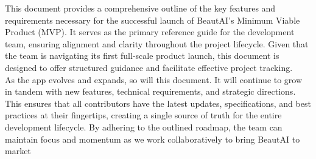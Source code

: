 This document provides a comprehensive outline of the key features and requirements necessary for the successful launch of BeautAI's Minimum Viable Product (MVP). It serves as the primary reference guide for the development team, ensuring alignment and clarity throughout the project lifecycle. Given that the team is navigating its first full-scale product launch, this document is designed to offer structured guidance and facilitate effective project tracking.
\\

As the app evolves and expands, so will this document. It will continue to grow in tandem with new features, technical requirements, and strategic directions. This ensures that all contributors have the latest updates, specifications, and best practices at their fingertips, creating a single source of truth for the entire development lifecycle. By adhering to the outlined roadmap, the team can maintain focus and momentum as we work collaboratively to bring BeautAI to market